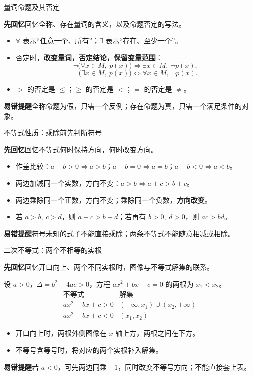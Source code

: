 \documentclass[UTF8,10pt,aspectratio=169,handout]{ctexbeamer}
\newcommand{\Recall}[1]{\par\noindent\textcolor{KnowledgeBlue}{\textbf{先回忆}\quad #1}\par\vspace{0.3cm}}
\newcommand{\Pitfall}[1]{\par\vspace{0.22cm}\noindent\textbf{易错提醒}\quad #1\par}
\begin{document}
\begin{frame}[t]{量词命题及其否定}
\large
\Recall{回忆全称、存在量词的含义，以及命题否定的写法。}
\pause
\begin{itemize}
  \item $\forall$ 表示“任意一个、所有”；$\exists$ 表示“存在、至少一个”。
  \item 否定时，\textbf{改变量词，否定结论，保留变量范围}：
  \[
    \neg\bigl(\forall x\in M,\ p(x)\bigr)\iff\exists x\in M,\ \neg p(x),
  \]
  \[
    \neg\bigl(\exists x\in M,\ p(x)\bigr)\iff\forall x\in M,\ \neg p(x).
  \]
  \item $>$ 的否定是 $\le$；$\ge$ 的否定是 $<$；$=$ 的否定是 $\ne$。
\end{itemize}
\Pitfall{全称命题为假，只需一个反例；存在命题为真，只需一个满足条件的对象。}
\end{frame}

\begin{frame}[t]{不等式性质：乘除前先判断符号}
\large
\Recall{回忆不等式何时保持方向，何时改变方向。}
\pause
\begin{itemize}
  \item 作差比较：$a-b>0\iff a>b$；$a-b=0\iff a=b$；$a-b<0\iff a<b$。
  \item 两边加减同一个实数，方向不变：$a>b\iff a+c>b+c$。
  \item 两边乘除同一个正数，方向不变；乘除同一个负数，\textbf{方向改变}。
  \item 若 $a>b,\ c>d$，则 $a+c>b+d$；若再有 $b>0,\ d>0$，则 $ac>bd$。
\end{itemize}
\Pitfall{符号未知的式子不能直接乘除；两条不等式不能随意相减或相除。}
\end{frame}

\begin{frame}[t]{二次不等式：两个不相等的实根}
\large
\Recall{回忆开口向上、两个不同实根时，图像与不等式解集的联系。}
\pause
设 $a>0$，$\Delta=b^2-4ac>0$，方程 $ax^2+bx+c=0$ 的两根为 $x_1<x_2$。
\[
\begin{array}{c|c}
\text{不等式}&\text{解集}\\ \hline
ax^2+bx+c>0&(-\infty,x_1)\cup(x_2,+\infty)\\[0.13cm]
ax^2+bx+c<0&(x_1,x_2)
\end{array}
\]
\begin{itemize}
  \item 开口向上时，两根外侧图像在 $x$ 轴上方，两根之间在下方。
  \item 不等号含等号时，将对应的两个实根补入解集。
\end{itemize}
\Pitfall{若 $a<0$，可先两边同乘 $-1$，同时改变不等号方向；不能直接套上表。}
\end{frame}
\end{document}
